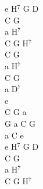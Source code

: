 \documentclass[a5paper, 10pt]{book}
\begin{document}
\begin{minipage}[t]{0.2\textwidth}
e H$^7$ G D\\
C G\\
a H$^7$\\
C G H$^7$\\

C G\\
a H$^7$\\
C G\\
a D$^7$\\
e\\
C G a\\
G a C G\\
a C e\\

e H$^7$ G D\\
C G\\
a H$^7$\\
C G H$^7$\\
\end{minipage}

\newpage
\end{document}
